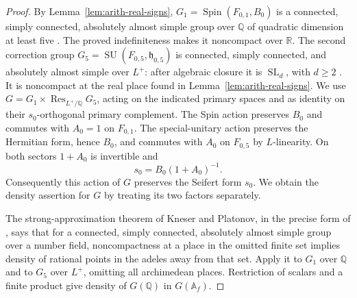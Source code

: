 \begin{proof}
By Lemma~\ref{lem:arith-real-signs},
$G_1=\operatorname{Spin}(F_{0,1},B_0)$ is a connected, simply
connected, absolutely almost simple group over $\mathbb Q$ of
quadratic dimension at least five
\cite[Proposition~C.3.10, Lemma~C.4.1, Proposition~C.4.10, and Example~C.6.6]{Conrad2014Reductive}.
The proved indefiniteness makes it noncompact over $\mathbb R$.
The second correction group
$G_5=\operatorname{SU}(F_{0,5},\mathfrak h_{0,5})$
is connected, simply connected,
and absolutely almost simple over $L^+$: after algebraic closure it
is $\operatorname{SL}_d$, with $d\ge2$
\cite[Proposition~24.40(b), equation~(158), and Summary~21.96]{Milne2022}.
It is noncompact at the real place found in
Lemma~\ref{lem:arith-real-signs}.
We use
$G=G_1\times\operatorname{Res}_{L^+/\mathbb Q}G_5$,
acting on the indicated primary spaces and as identity on their
$s_0$-orthogonal primary complement. The Spin action preserves
$B_0$ and commutes with $A_0=1$ on $F_{0,1}$. The special-unitary
action preserves the Hermitian form, hence $B_0$, and commutes with
$A_0$ on $F_{0,5}$ by $L$-linearity. On both sectors $1+A_0$ is
invertible and
\[
 s_0=B_0(1+A_0)^{-1}.
\]
Consequently this action of $G$ preserves the Seifert form $s_0$.
We obtain the density assertion for $G$ by treating its two factors
separately.

The strong-approximation theorem of Kneser and Platonov, in the
precise form of \cite[Theorem~2.3]{Rapinchuk2014}, says that for a
connected, simply connected, absolutely almost simple group over a
number field, noncompactness at a place in the omitted finite set
implies density of rational points in the adeles away from that set.
Apply it to $G_1$ over $\mathbb Q$ and to $G_5$ over $L^+$, omitting
all archimedean places.  Restriction of scalars and a finite
product give density of $G(\mathbb Q)$ in $G(\mathbb A_f)$.


\end{proof}
